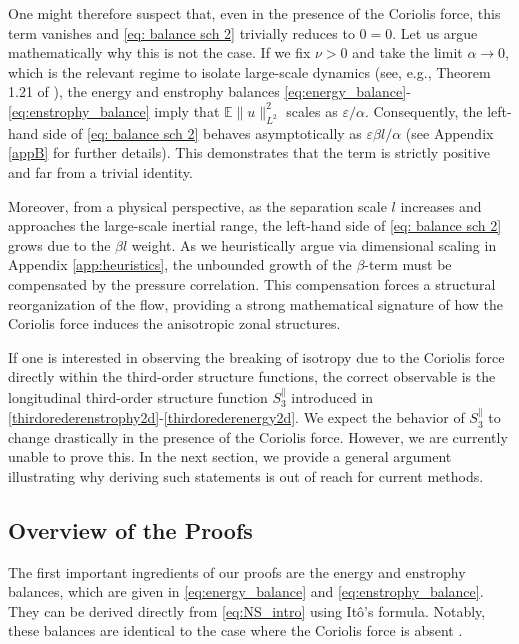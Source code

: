 \documentclass[11pt,a4paper]{article}
\numberwithin{equation}{section}
\numberwithin{theorem}{section}
\numberwithin{remark}{section}
\numberwithin{definition}{section}
\begin{document}
One might therefore suspect that, even in the presence of the Coriolis force, this term vanishes and \eqref{eq: balance sch 2} trivially reduces to $0=0$. Let us argue mathematically why this is not the case. If we fix $\nu > 0$ and take the limit $\alpha \to 0$, which is the relevant regime to isolate large-scale dynamics (see, e.g., Theorem 1.21 of \cite{bed2D}), the energy and enstrophy balances \eqref{eq:energy_balance}-\eqref{eq:enstrophy_balance} imply that $\mathbb{E}\|u\|_{L^2}^2$ scales as $\varepsilon/\alpha$. Consequently, the left-hand side of \eqref{eq: balance sch 2} behaves asymptotically as $\varepsilon \beta l / \alpha$ (see Appendix \ref{appB} for further details). This demonstrates that the term is strictly positive and far from a trivial identity.

Moreover, from a physical perspective, as the separation scale $l$ increases and approaches the large-scale inertial range, the left-hand side of \eqref{eq: balance sch 2} grows due to the $\beta l$ weight. As we heuristically argue via dimensional scaling in Appendix \ref{app:heuristics}, the unbounded growth of the $\beta$-term must be compensated by the pressure correlation. This compensation forces a structural reorganization of the flow, providing a strong mathematical signature of how the Coriolis force induces the anisotropic zonal structures.

If one is interested in observing the breaking of isotropy due to the Coriolis force directly within the third-order structure functions, the correct observable is the longitudinal third-order structure function $S_3^{\parallel}$ introduced in \eqref{thirdorederenstrophy2d}-\eqref{thirdorederenergy2d}. We expect the behavior of $S_3^{\parallel}$ to change drastically in the presence of the Coriolis force. However, we are currently unable to prove this. In the next section, we provide a general argument illustrating why deriving such statements is out of reach for current methods.

\subsection{Overview of the Proofs}

The first important ingredients of our proofs are the energy and enstrophy balances, which are given in \eqref{eq:energy_balance} and \eqref{eq:enstrophy_balance}. They can be derived directly from \eqref{eq:NS_intro} using Itô's formula. Notably, these balances are identical to the case where the Coriolis force is absent \cite{YuriAmiraliGigliola}. 
\end{document}
